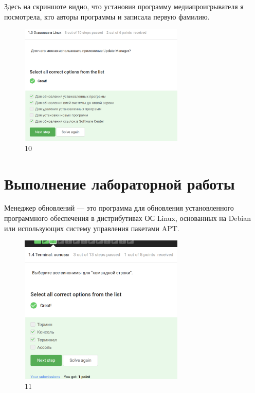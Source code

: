 Здесь на скриншоте видно, что установив программу медиапроигрывателя я
посмотрела, кто авторы программы и записала первую фамилию.

\begin{figure}
\hypertarget{fig:010}{%
\centering
\includegraphics[width=0.7\textwidth,height=\textheight]{image/10.png}
\caption{10}\label{fig:010}
}
\end{figure}

\hypertarget{ux432ux44bux43fux43eux43bux43dux435ux43dux438ux435-ux43bux430ux431ux43eux440ux430ux442ux43eux440ux43dux43eux439-ux440ux430ux431ux43eux442ux44b-8}{%
\section{Выполнение лабораторной
работы}\label{ux432ux44bux43fux43eux43bux43dux435ux43dux438ux435-ux43bux430ux431ux43eux440ux430ux442ux43eux440ux43dux43eux439-ux440ux430ux431ux43eux442ux44b-8}}

Менеджер обновлений --- это программа для обновления установленного
программного обеспечения в дистрибутивах ОС Linux, основанных на Debian
или использующих систему управления пакетами APT.

\begin{figure}
\hypertarget{fig:011}{%
\centering
\includegraphics[width=0.7\textwidth,height=\textheight]{image/11.png}
\caption{11}\label{fig:011}
}
\end{figure}

